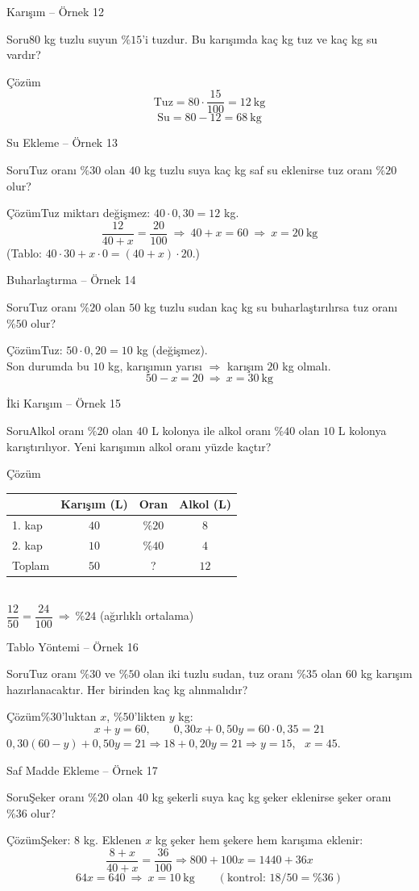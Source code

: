\documentclass[aspectratio=169,11pt,handout]{beamer}
\newcommand{\soru}[3]{%
\begin{frame}{#1}
  \begin{block}{Soru}\large #2\end{block}
  \pause
  \begin{exampleblock}{Çözüm}\large #3\end{exampleblock}
\end{frame}}
\begin{document}
\soru{Karışım -- Örnek 12}
{\(80\) kg tuzlu suyun \(\%15\)'i tuzdur. Bu karışımda kaç kg tuz ve kaç kg su vardır?}
{\[\text{Tuz}=80\cdot\frac{15}{100}=12\ \text{kg}\]
\[\text{Su}=80-12=68\ \text{kg}\]}

\soru{Su Ekleme -- Örnek 13}
{Tuz oranı \(\%30\) olan \(40\) kg tuzlu suya kaç kg saf su eklenirse tuz oranı \(\%20\) olur?}
{Tuz miktarı değişmez: \(40\cdot 0{,}30=12\) kg.
\[\frac{12}{40+x}=\frac{20}{100}\ \Rightarrow\ 40+x=60\ \Rightarrow\ x=20\ \text{kg}\]
(Tablo: \(40\cdot 30+x\cdot 0=(40+x)\cdot 20\).)}

\soru{Buharlaştırma -- Örnek 14}
{Tuz oranı \(\%20\) olan \(50\) kg tuzlu sudan kaç kg su buharlaştırılırsa tuz oranı \(\%50\) olur?}
{Tuz: \(50\cdot 0{,}20=10\) kg (değişmez).\\[3pt]
Son durumda bu \(10\) kg, karışımın yarısı \(\Rightarrow\) karışım \(20\) kg olmalı.
\[50-x=20\ \Rightarrow\ x=30\ \text{kg}\]}

\soru{İki Karışım -- Örnek 15}
{Alkol oranı \(\%20\) olan \(40\) L kolonya ile alkol oranı \(\%40\) olan \(10\) L kolonya karıştırılıyor. Yeni karışımın alkol oranı yüzde kaçtır?}
{\normalsize
\begin{tabular}{lccc}
\toprule
 & Karışım (L) & Oran & Alkol (L)\\\midrule
1. kap & \(40\) & \(\%20\) & \(8\)\\
2. kap & \(10\) & \(\%40\) & \(4\)\\
Toplam & \(50\) & ? & \(12\)\\\bottomrule
\end{tabular}\\[4pt]
\large \(\dfrac{12}{50}=\dfrac{24}{100}\ \Rightarrow\ \%24\) \quad (ağırlıklı ortalama)}

\soru{Tablo Yöntemi -- Örnek 16}
{Tuz oranı \(\%30\) ve \(\%50\) olan iki tuzlu sudan, tuz oranı \(\%35\) olan \(60\) kg karışım hazırlanacaktır. Her birinden kaç kg alınmalıdır?}
{\(\%30\)'luktan \(x\), \(\%50\)'likten \(y\) kg:
\[x+y=60,\qquad 0{,}30x+0{,}50y=60\cdot 0{,}35=21\]
\(0{,}30(60-y)+0{,}50y=21\Rightarrow 18+0{,}20y=21\Rightarrow y=15\), \ \(x=45\).}

\soru{Saf Madde Ekleme -- Örnek 17}
{Şeker oranı \(\%20\) olan \(40\) kg şekerli suya kaç kg şeker eklenirse şeker oranı \(\%36\) olur?}
{Şeker: \(8\) kg. Eklenen \(x\) kg şeker hem şekere hem karışıma eklenir:
\[\frac{8+x}{40+x}=\frac{36}{100}\Rightarrow 800+100x=1440+36x\]
\[64x=640\ \Rightarrow\ x=10\ \text{kg}\qquad(\text{kontrol: } 18/50=\%36)\]}
\end{document}
